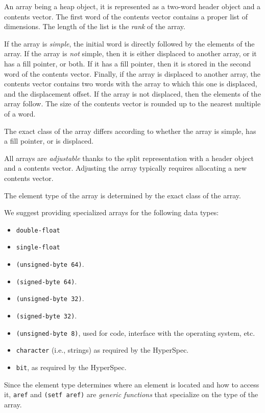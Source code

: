 An array being a heap object, it is represented as a two-word header
object and a contents vector.  The first word of the contents vector
contains a proper list of dimensions.  The length of the list is the
\emph{rank} of the array.

If the array is \emph{simple}, the initial word is directly followed
by the elements of the array.  If the array is \emph{not} simple, then
it is either displaced to another array, or it has a fill pointer, or
both.  If it has a fill pointer, then it is stored in the second word
of the contents vector.  Finally, if the array is displaced to another
array, the contents vector contains two words with the array to which
this one is displaced, and the displacement offset.  If the array is
not displaced, then the elements of the array follow.  The size of the
contents vector is rounded up to the nearest multiple of a word. 

The exact class of the array differs according to whether the array is
simple, has a fill pointer, or is displaced. 

All arrays are \emph{adjustable} thanks to the split representation
with a header object and a contents vector.  Adjusting the array
typically requires allocating a new contents vector. 

The element type of the array is determined by the exact class of the
array. 

We suggest providing specialized arrays for the following data types:

\begin{itemize}
\item \texttt{double-float}
\item \texttt{single-float}
\item \texttt{(unsigned-byte 64)}.
\item \texttt{(signed-byte 64)}.
\item \texttt{(unsigned-byte 32)}.
\item \texttt{(signed-byte 32)}.  
\item \texttt{(unsigned-byte 8)}, used for code, interface with the
  operating system, etc. 
\item \texttt{character} (i.e., strings) as required by the HyperSpec.
\item \texttt{bit}, as required by the HyperSpec.
\end{itemize}

Since the element type determines where an element is located and how
to access it, \texttt{aref} and \texttt{(setf aref)} are \emph{generic
  functions} that specialize on the type of the array. 

